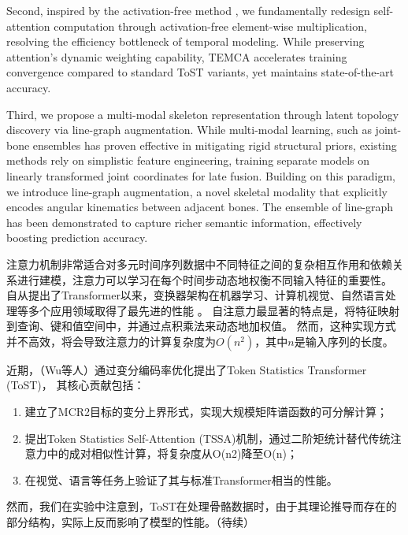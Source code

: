 Second, inspired by the activation-free method \cite{rewrite_stars}, we fundamentally redesign self-attention computation through 
activation-free element-wise multiplication, resolving the efficiency 
bottleneck of temporal modeling. 
While preserving attention's dynamic weighting capability, TEMCA 
accelerates training convergence compared to standard 
ToST variants, yet maintains state-of-the-art accuracy. 


Third, we propose a multi-modal skeleton representation through latent 
topology discovery via line-graph augmentation. While multi-modal 
learning, such as joint-bone ensembles \cite{ref9,ref10,ref11,ref13} has proven 
effective in mitigating rigid structural priors, existing methods rely 
on simplistic feature engineering, training separate models on linearly 
transformed joint coordinates for late fusion. 
Building on this paradigm, we introduce line-graph augmentation, a 
novel skeletal modality that explicitly encodes angular kinematics 
between adjacent bones. The ensemble of line-graph has been demonstrated 
to capture richer semantic information, effectively boosting prediction 
accuracy.



注意力机制非常适合对多元时间序列数据中不同特征之间的复杂相互作用和依赖关系进行建模，注意力可以学习在每个时间步动态地权衡不同输入特征的重要性\cite{temporal-attention-useful}。
自从\cite{attention-is-all-you-need}提出了Transformer以来，变换器架构在机器学习、计算机视觉、自然语言处理等多个应用领域取得了最先进的性能
\cite{bert} \cite{radford2019language} \cite{brown2020language} \cite{chen2020generative} \cite{dosovitskiy2020image}。
自注意力最显著的特点是，将特征映射到查询、键和值空间中，并通过点积乘法来动态地加权值。
然而，这种实现方式并不高效，将会导致注意力的计算复杂度为$O(n^2)$，其中$n$是输入序列的长度。

近期，（Wu等人）通过变分编码率优化提出了Token Statistics Transformer (ToST)\cite{tost}，
其核心贡献包括：
\begin{enumerate}
    \item 建立了MCR2目标的变分上界形式，实现大规模矩阵谱函数的可分解计算；
    \item 提出Token Statistics Self-Attention (TSSA)机制，通过二阶矩统计替代传统注意力中的成对相似性计算，将复杂度从O(n2)降至O(n)；
    \item 在视觉、语言等任务上验证了其与标准Transformer相当的性能。
\end{enumerate}

然而，我们在实验中注意到，ToST在处理骨骼数据时，由于其理论推导而存在的部分结构，实际上反而影响了模型的性能。（待续）